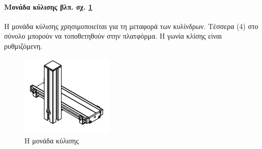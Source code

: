 \documentclass[a4paper,12pt,twoside]{report}
\begin{document}
				\paragraph{Μονάδα κύλισης {\footnotesize βλπ. σχ. \ref{φωτ:Η μονάδα κύλισης από Festo}} } {Η μονάδα κύλισης χρησιμοποιείται για τη μεταφορά των κυλίνδρων. Τέσσερα (4) στο σύνολο μπορούν να τοποθετηθούν στην πλατφόρμα. Η γωνία κλίσης είναι ρυθμιζόμενη.
				}
				\begin{figure}[hp]
					\centering
					\includegraphics[scale=1]{TestingStationSlideModule.png}
					\caption{Η μονάδα κύλισης \cite{FestoMPSTestingStationManual}}
					\label{φωτ:Η μονάδα κύλισης από Festo}
				\end{figure}
				
				
\end{document}
